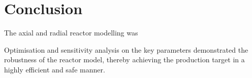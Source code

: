 \section{Conclusion} \label{sec:conclusion}

The axial and radial reactor modelling was 

Optimisation and sensitivity analysis on the key parameters demonstrated the robustness of the reactor model, thereby achieving the production target in a highly efficient and safe manner. 